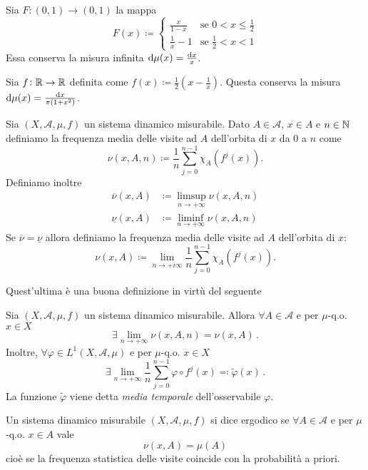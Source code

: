 \begin{exercise}
    Sia $ F\colon (0,1)\to (0,1) $ la mappa
    \[
        F(x) \coloneqq
        \begin{cases}
            \frac{x}{1-x}   & \text{se } 0 < x \leq \frac{1}{2} \\
            \frac{1}{x} - 1 & \text{se } \frac{1}{2} < x < 1
        \end{cases}
    \]
    Essa conserva la misura infinita $ \dif{\mu}(x) = \frac{\dif{x}}{x} $.
\end{exercise}

\begin{exercise}
    Sia $ f\colon \mathbb{R}\to\mathbb{R} $ definita come $ f(x) \coloneqq \frac{1}{2} \left( x - \frac{1}{x} \right) $. Questa conserva la misura $ \dif{\mu}(x) = \frac{\dif{x}}{\pi(1+x^2)} $.
\end{exercise}

\begin{definition}
    Sia $ (X, \mathcal{A}, \mu, f) $ un sistema dinamico misurabile. Dato $ A \in \mathcal{A} $, $ x \in A $ e $ n \in \mathbb{N} $ definiamo la frequenza media delle visite ad $ A $ dell'orbita di $ x $ da $ 0 $ a $ n $ come
    \[
        \nu(x, A, n) \coloneqq \frac{1}{n} \sum_{j = 0}^{n-1} \chi_A(f^{j}(x)).
    \]
    Definiamo inoltre
    \begin{align*}
        \overline{\nu}(x, A) & \coloneqq \limsup_{n \to +\infty} \nu(x, A, n) \\
        \underline{\nu}(x, A) & \coloneqq \liminf_{n \to +\infty} \nu(x, A, n)
    \end{align*}
    Se $ \overline{\nu} = \underline{\nu} $ allora definiamo la frequenza media delle visite ad $ A $ dell'orbita di $ x $:
    \[
        \nu(x, A) \coloneqq \lim_{n \to +i\infty} \frac{1}{n} \sum_{j = 0}^{n-1} \chi_A(f^{j}(x)).
    \]
\end{definition}
Quest'ultima è una buona definizione in virtù del seguente
\begin{thm}[Birkhoff]\label{thm:Birkhoff}
    Sia $ (X,\mathcal{A},\mu,f) $ un sistema dinamico misurabile. Allora $ \forall A\in\mathcal{A} $ e per $ \mu $-q.o. $ x\in X $
    \[ \exists \lim_{n \to +\infty} \nu(x,A,n) = \nu(x,A) \, . \]
    Inoltre, $ \forall \varphi \in L^1(X,\mathcal{A},\mu) $ e per $ \mu $-q.o. $ x\in X $
    \[ \exists \lim_{n \to +\infty} \frac{1}{n} \sum_{j=0}^{n-1} \varphi\circ f^j(x) \eqqcolon \tilde{\varphi}(x) \, . \]
    La funzione $ \tilde{\varphi} $ viene detta \emph{media temporale} dell'osservabile $ \varphi $.
\end{thm}

\begin{definition}
    Un sistema dinamico misurabile $ (X, \mathcal{A}, \mu, f) $ si dice ergodico se $ \forall A \in \mathcal{A} $ e per $ \mu $-q.o. $ x \in A $ vale
    \[
        \nu(x, A) = \mu(A)
    \]
    cioè se la frequenza statistica delle visite coincide con la probabilità a priori. 
\end{definition}
